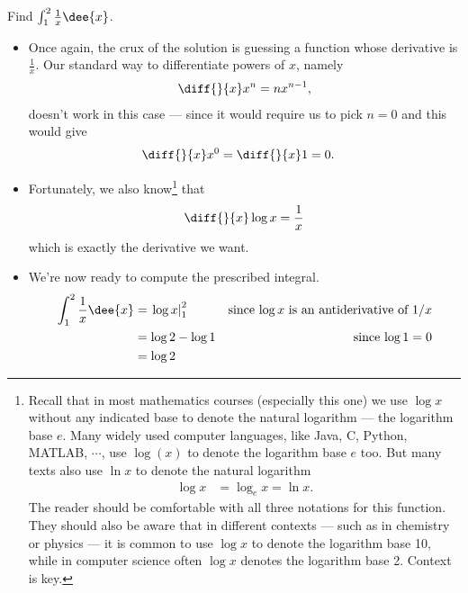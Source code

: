 \begin{eg}\label{eg:INTintegralC}
Find $\int_1^2 \frac{1}{x}\dee{x}$.

\soln
\begin{itemize}
 \item Once again, the crux of the solution is guessing a function whose
derivative is $\frac{1}{x}$. Our standard way to differentiate powers of $x$, namely
\begin{align*}
\diff{}{x} x^n= n x^{n-1},
\end{align*}
doesn't work in this case --- since it would require us to pick $n=0$ and this would
give
\begin{align*}
  \diff{}{x} x^0 &= \diff{}{x} 1 = 0.
\end{align*}
\item Fortunately, we also know\footnote{Recall that in most mathematics
courses (especially this one) we use $\log x$ without any indicated base
to denote the natural logarithm --- the logarithm base $e$.
Many widely used computer languages, like Java, C, Python, MATLAB, $\cdots$,
use $\log(x)$ to denote the logarithm base $e$ too. But many texts also use $\ln x$ to denote the natural logarithm
\begin{align*}
  \log x &= \log_e x = \ln x.
\end{align*}
The reader should be comfortable with all three notations for this function. They should
also be aware that in different contexts --- such as in chemistry or physics --- it is
common to use $\log x$ to denote the logarithm base 10, while in computer science often
$\log x$ denotes the logarithm base 2. Context is key.
} that
\begin{align*}
\diff{}{x}\log x = \frac{1}{x}
\end{align*}
which is exactly the derivative we want.
\item We're now ready to compute the prescribed integral.
\begin{align*}
\int_1^2 \frac{1}{x}\dee{x}
&= \left. \log x \right|_1^2 & \text{since $\log x$ is an antiderivative of $1/x$}\\
&= \log 2 - \log 1 & \text{since $\log 1 = 0$} \\
&= \log 2
\end{align*}
\end{itemize}
\end{eg}


